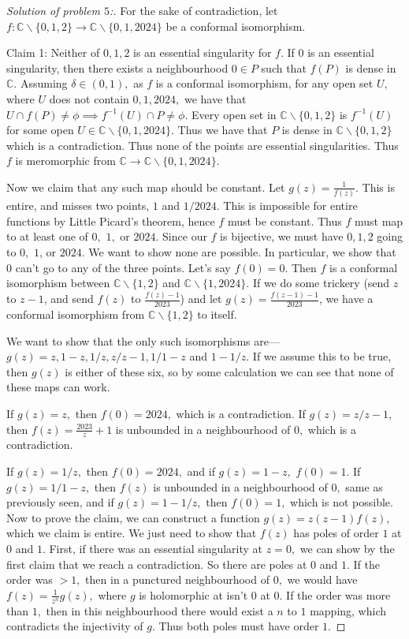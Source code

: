 \documentclass[letterpaper,11pt,twoside]{article}
\theoremstyle{proposition}
\theoremstyle{definition}
\theoremstyle{theorem}
\theoremstyle{definition}
\theoremstyle{definition}
\theoremstyle{definition}
\theoremstyle{lemma}
\theoremstyle{definition}
\theoremstyle{definition}
\theoremstyle{corollary}
\theoremstyle{definition}
\theoremstyle{definition}
\theoremstyle{definition}
\begin{document}
	\begin{proof}[Solution of problem $5$:]
	For the sake of contradiction, let $f: \mathbb{C} \backslash \{0,1,2\} \to \mathbb{C} \backslash \{0,1,2024\}$ be a conformal isomorphism. 
	
	Claim 1: Neither of $0,1,2$ is an essential singularity for $f.$ If $0$ is an essential singularity, then there exists a neighbourhood $0 \in P$ such 
	that $f(P)$ is dense in $\mathbb{C}.$ Assuming $\delta \in (0,1),$ as $f$ is a conformal isomorphism, for any open set $U,$ where $U$ does not contain 
	$0,1, 2024 ,$ we have that $U \cap f(P) \neq \phi \implies f^{-1}(U) \cap P \neq \phi. $ Every open set in $\mathbb{C} \backslash \{0,1,2\}$ is 
	$f^{-1}(U)$ for some open $U \in \mathbb{C} \backslash \{0,1,2024\}.$ Thus we have that $ P $ is dense in $\mathbb{C} \backslash \{0,1,2\}$ which is a 
	contradiction. Thus none of the points are essential singularities. Thus $f$ is meromorphic from $\mathbb{C} \to \mathbb{C} \backslash \{0,1,2024\}$. 
	
	Now we claim that any such map should be constant. Let $g(z)= \frac{1}{f(z)}.$ This is entire, and misses two points, $1$ and $1/2024.$ This is 
	impossible for entire functions by Little Picard's theorem, hence $f$ must be constant.  Thus $f$ must map to at least one of $0,$ $1,$ or $2024.$ Since 
	our $f$ is bijective, we must have $0,1,2$ going to $0,$ $1$,  or $2024.$ We want to show none are possible. In particular, we show that $0$ can't go to 
	any of the three points. Let's say $f(0)=0.$ Then $f$ is a conformal isomorphism between $\mathbb{C} \backslash \{1,2\}$ and $\mathbb{C} \backslash 
	\{1,2024\}.$ If we do some trickery (send $z$ to $z-1$, and send $f(z)$ to $ \frac{f(z)-1}{2023}$) and let $g(z)= \frac{f(z-1)-1}{2023}$, we have a 
	conformal isomorphism from $\mathbb{C} \backslash \{1,2\}$  to itself. 
	
	We want to show that the only such isomorphisms are---
	$g(z)=z,1-z, 1/z, z/z-1,1/1-z$ and $1- 1/z.$ If we assume this to be true, then $ g(z) $ is either of these six, so by some calculation we can see that 
	none of these maps can work.
	
	If $g(z)=z,$ then $ f(0)=2024,$ which is a contradiction. If $g(z)= z/z-1,$ then $f(z)= \frac{2023}{z} +1$ is unbounded in a neighbourhood of $0,$ which 
	is a contradiction. 
	
	If $g(z) = 1/z,$ then $f(0)= 2024,$ and if $g(z)=1-z,$ $f(0)=1.$ If $g(z)= 1/1-z,$ then $f(z)$ is unbounded in a neighbourhood of $0,$ same as 
	previously seen, and if $g(z)= 1- 1/z,$ then $f(0)=1,$ which is not possible. Now to prove the claim, we can construct a function $g(z)=z(z-1)f(z),$ 
	which we claim is entire. We just need to show that $f(z)$ has poles of order $1$ at $0$ and $1.$ First, if there was an essential singularity at $z=0,$ 
	we can show by the first claim that we reach a contradiction. So there are poles at $0$ and $1.$ If the order was $>1,$ then in a punctured 
	neighbourhood of $0,$ we would have $f(z)= \frac{1}{z^n}g(z),$ where $g$ is holomorphic at isn't $0$ at $0.$ If the order was more than $1,$ then in 
	this neighbourhood there would exist a $n$ to $1$ mapping, which contradicts the injectivity of $g.$ Thus both poles must have order $1.$ 
	

\end{proof}
\end{document}
